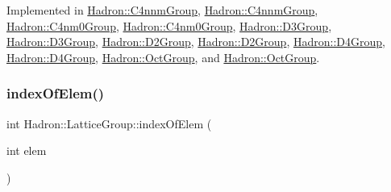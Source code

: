 Implemented in \mbox{\hyperlink{structHadron_1_1C4nnmGroup_a9f35739dbd3ad6effd0e675d40b5341d}{Hadron\+::\+C4nnm\+Group}}, \mbox{\hyperlink{structHadron_1_1C4nnmGroup_a9f35739dbd3ad6effd0e675d40b5341d}{Hadron\+::\+C4nnm\+Group}}, \mbox{\hyperlink{structHadron_1_1C4nm0Group_a2a84060776245ed0045a7271b00064eb}{Hadron\+::\+C4nm0\+Group}}, \mbox{\hyperlink{structHadron_1_1C4nm0Group_a2a84060776245ed0045a7271b00064eb}{Hadron\+::\+C4nm0\+Group}}, \mbox{\hyperlink{structHadron_1_1D3Group_a60e24b1e2d17481b7ab94860c95ce155}{Hadron\+::\+D3\+Group}}, \mbox{\hyperlink{structHadron_1_1D3Group_a60e24b1e2d17481b7ab94860c95ce155}{Hadron\+::\+D3\+Group}}, \mbox{\hyperlink{structHadron_1_1D2Group_aa6d99edf22f99550602f38437aadd890}{Hadron\+::\+D2\+Group}}, \mbox{\hyperlink{structHadron_1_1D2Group_aa6d99edf22f99550602f38437aadd890}{Hadron\+::\+D2\+Group}}, \mbox{\hyperlink{structHadron_1_1D4Group_ae6c08a58023532bcf277f60c1dddde4f}{Hadron\+::\+D4\+Group}}, \mbox{\hyperlink{structHadron_1_1D4Group_ae6c08a58023532bcf277f60c1dddde4f}{Hadron\+::\+D4\+Group}}, \mbox{\hyperlink{structHadron_1_1OctGroup_a0d21b9bbc5cc2cafa4945e9dd5608a6b}{Hadron\+::\+Oct\+Group}}, and \mbox{\hyperlink{structHadron_1_1OctGroup_a0d21b9bbc5cc2cafa4945e9dd5608a6b}{Hadron\+::\+Oct\+Group}}.

\mbox{\label{structHadron_1_1LatticeGroup_a4a664d3cbcc8a3b1634e4eb8434f1199}} 
\subsubsection{\texorpdfstring{indexOfElem()}{indexOfElem()}\hspace{0.1cm}{\footnotesize\ttfamily [1/2]}}
{\footnotesize\ttfamily int Hadron\+::\+Lattice\+Group\+::index\+Of\+Elem (\begin{DoxyParamCaption}\item[{int}]{elem }\end{DoxyParamCaption})\hspace{0.3cm}{\ttfamily [inline]}}

\mbox{\label{structHadron_1_1LatticeGroup_a4a664d3cbcc8a3b1634e4eb8434f1199}} 
